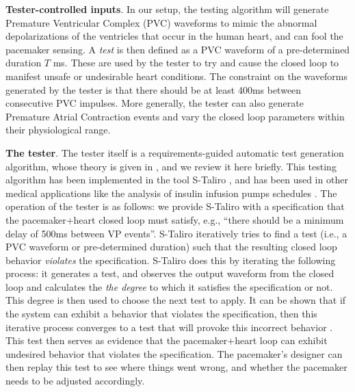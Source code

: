 \textbf{Tester-controlled inputs}.
In our setup, the testing algorithm will generate Premature Ventricular Complex (PVC) waveforms to mimic the abnormal depolarizations of the ventricles that occur in the human heart, and can fool the pacemaker sensing. 
A \emph{test} is then defined as a PVC waveform of a pre-determined duration $T$ ms.
These are used by the tester to try and cause the closed loop to manifest unsafe or undesirable heart conditions.
The constraint on the waveforms generated by the tester is that there should be at least 400ms between consecutive PVC impulses.
More generally, the tester can also generate Premature Atrial Contraction events and vary the closed loop parameters within their physiological range.

\textbf{The tester}.
The tester itself is a requirements-guided automatic test generation algorithm, whose theory is given in \cite{AbbasFSIG13tecs}, and we review it here briefly.
This testing algorithm has been implemented in the tool S-Taliro \cite{AnnapureddyLFS11tacas}, and has been used in other medical applications like the analysis of insulin infusion pumps schedules \cite{SankaranarayananF2012cmsb}.
The operation of the tester is as follows: we provide S-Taliro with a specification that the pacemaker+heart closed loop must satisfy,
e.g., ``there should be a minimum delay of 500ms between VP events''.
S-Taliro iteratively tries to find a test (i.e., a PVC waveform or pre-determined duration) such that the resulting closed loop behavior \emph{violates} the specification.
S-Taliro does this by iterating the following process: it generates a test, and observes the output waveform from the closed loop and calculates the \emph{the degree} to which it satisfies the specification or not.
This degree is then used to choose the next test to apply. 
It can be shown that if the system can exhibit a behavior that violates the specification, then this iterative process converges to a test that will provoke this incorrect behavior \cite{AbbasF_HybridSA12}. 
This test then serves as evidence that the pacemaker+heart loop can exhibit undesired behavior that violates the specification.
The pacemaker's designer can then replay this test to see where things went wrong, and whether the pacemaker needs to be adjusted accordingly.

